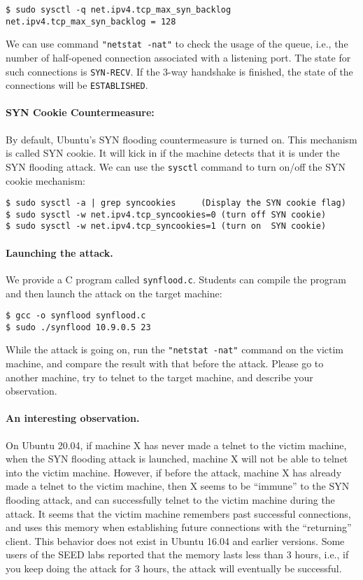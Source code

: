 \begin{lstlisting}
$ sudo sysctl -q net.ipv4.tcp_max_syn_backlog
net.ipv4.tcp_max_syn_backlog = 128
\end{lstlisting}

We can use command \texttt{"netstat -nat"} to check the usage of the queue, 
i.e., the number of half-opened connection associated with a listening port. 
The state for such connections is \texttt {SYN-RECV}. If the 3-way handshake
is finished, the state of the connections will be {\tt ESTABLISHED}.


\paragraph{SYN Cookie Countermeasure:}
By default, Ubuntu's SYN flooding countermeasure is turned on. This 
mechanism is called SYN cookie. It will kick in if the machine
detects that it is under the SYN flooding attack.
We can use the {\tt sysctl} command to turn on/off the SYN 
cookie mechanism:

\begin{lstlisting}
$ sudo sysctl -a | grep syncookies     (Display the SYN cookie flag) 
$ sudo sysctl -w net.ipv4.tcp_syncookies=0 (turn off SYN cookie)
$ sudo sysctl -w net.ipv4.tcp_syncookies=1 (turn on  SYN cookie)
\end{lstlisting}



\paragraph{Launching the attack.}
We provide a C program called \texttt{synflood.c}. Students can compile
the program and then launch the attack on the target machine:

\begin{lstlisting}
$ gcc -o synflood synflood.c
$ sudo ./synflood 10.9.0.5 23
\end{lstlisting}
 

While the attack is going on, 
run the \texttt{"netstat -nat"} command on the victim machine, and compare 
the result with that before the attack. 
Please go to another machine, try to telnet to the target machine, 
and describe your observation.


\paragraph{An interesting observation.} On Ubuntu 20.04, if machine X
has never made a telnet to the victim machine, when the SYN flooding 
attack is launched, machine X will not be able to telnet into the 
victim machine. However, if before the attack, machine X
has already made a telnet to the victim machine, then X 
seems to be ``immune'' to the SYN flooding attack, and can
successfully telnet to the victim machine during the attack. 
It seems that the victim machine remembers past successful 
connections, and uses this memory when establishing
future connections with the ``returning'' client. 
This behavior does not exist in Ubuntu 16.04 
and earlier versions. Some users of the SEED labs
reported that the memory lasts less than 3 hours, i.e.,
if you keep doing the attack for 3 hours, the attack
will eventually be successful.


